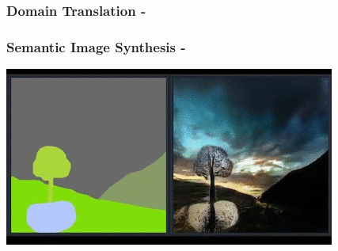 \documentclass{beamer}
\begin{document}
{
	\begin{frame}
		\frametitle{Domain Translation - \cite{isolaImagetoImageTranslationConditional2016a}}
	\end{frame}
}


	\begin{frame}
		\frametitle{Semantic Image Synthesis - \cite{parkSemanticImageSynthesis2019}}
		\href{run:images/treepond.mp4?autostart&loop&noprogress}{\includegraphics[width=\textwidth]{images/treepond.png}}
	\end{frame}
\end{document}
